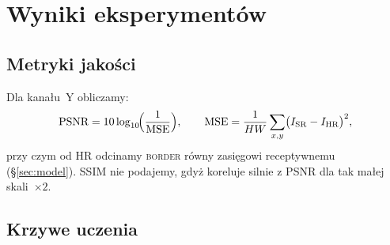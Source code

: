 \documentclass[11pt]{article}
\begin{document}
\section{Wyniki eksperymentów}
\label{sec:results}

\subsection{Metryki jakości}

Dla kanału~Y obliczamy:
\[
  \text{PSNR} = 10 \log_{10}\!
  \Bigl(\frac{1}{\text{MSE}}\Bigr),\qquad
  \text{MSE}=\frac1{HW}\sum_{x,y}
  \bigl(I_\mathrm{SR}-I_\mathrm{HR}\bigr)^{2},
\]
przy czym od HR odcinamy \textsc{border} równy zasięgowi receptywnemu
(\S\ref{sec:model}).  SSIM nie podajemy, gdyż koreluje silnie z PSNR
dla tak małej skali~$\times2$.

\subsection{Krzywe uczenia}
\end{document}
